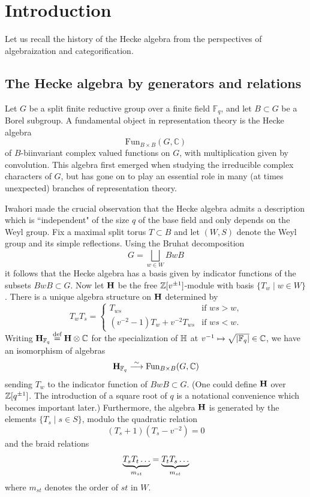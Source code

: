 \section{Introduction}
\label{sec-intro}

Let us recall the history of the Hecke algebra from the perspectives of algebraization and categorification.

\subsection{The Hecke algebra by generators and relations}

Let $G$ be a split finite reductive group over a finite field $\mathbb{F}_q$, and let $B \subset G$ be a Borel subgroup.  A fundamental object in representation theory is the Hecke algebra
\[
\mathrm{Fun}_{B \times B}(G, \mathbb{C})
\]
of $B$-biinvariant complex valued functions on $G$, with multiplication given by convolution. This algebra first emerged when studying the irreducible complex characters of $G$, but has gone on to play an essential role in many (at times unexpected) branches of representation theory.

Iwahori \cite{Iwahori} made the crucial observation that the Hecke algebra admits a description which is ``independent" of the size $q$ of the base field and only depends on the Weyl group.
Fix a maximal split torus $T \subset B$ and let $(W,S)$ denote the Weyl group and its simple reflections. Using the Bruhat decomposition
\[
G = \bigsqcup_{w \in W} BwB
\]
it follows that the Hecke algebra has a basis given by indicator functions of the subsets $BwB \subset G$. Now let ${\mathbf H}$ be the free ${\mathbb{Z}}[v^{\pm 1}]$-module with basis $\{ T_w \; | \; w \in W \}$. There is a unique algebra structure on ${\mathbf H}$ determined by
\[
T_wT_s = \begin{cases} T_{ws} & \text{if $ws > w$,} \\ (v^{-2}-1)T_w + v^{-2}T_{ws} & \text{if $ws < w$}. \end{cases}
\]
Writing ${\mathbf H}_{{\mathbb{F}}_q} \stackrel{\mbox{\scriptsize{def}}}{=} {\mathbf H} \otimes {\mathbb{C}}$ for the specialization of ${\mathbb{H}}$ at $v^{-1} \mapsto \sqrt{|{\mathbb{F}}_q|} \in {\mathbb{C}}$, we have an isomorphism of algebras
\[
{\mathbf H}_{{\mathbb{F}}_q} \stackrel{\sim}{\longrightarrow} \mathrm{Fun}_{B \times B}(G, \mathbb{C})
\]
sending $T_w$ to the indicator function of $BwB \subset G$. (One could define ${\mathbf H}$ over ${\mathbb{Z}}[q^{\pm 1}]$. The introduction of a square root of $q$ is a notational convenience which becomes important later.)
Furthermore, the algebra ${\mathbf H}$ is generated by the elements $\{T_s \; | \; s \in S \}$, modulo the quadratic relation \[ (T_s + 1)(T_s - v^{-2}) = 0\] and the braid relations
\[ \underbrace{T_sT_t \dots }_{m_{st}} = \underbrace{T_tT_s \dots}_{m_{st} }
\] where $m_{st}$ denotes the order of $st$ in $W$.

